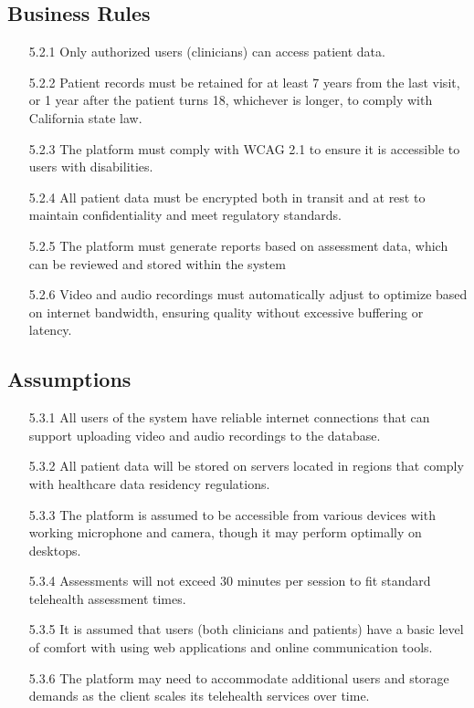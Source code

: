 \documentclass[12pt]{article}
\begin{document}
\subsection{Business Rules}
\begin{itemize}
  \item[5.2.1] Only authorized users (clinicians) can access patient data.
  \item[5.2.2] Patient records must be retained for at least 7 years from the last visit, or 1 year after the patient turns 18, whichever is longer, 
  to comply with California state law.
  \item[5.2.3] The platform must comply with WCAG 2.1 to ensure it is accessible to users with disabilities.
  \item[5.2.4] All patient data must be encrypted both in transit and at rest to maintain confidentiality and meet regulatory standards.
  \item[5.2.5] The platform must generate reports based on assessment data, which can be reviewed and stored within the system 
  \item[5.2.6] Video and audio recordings must automatically adjust to optimize based on internet bandwidth, ensuring quality without excessive 
  buffering or latency.
\end{itemize}
\subsection{Assumptions}
\begin{itemize}
  \item[5.3.1] All users of the system have reliable internet connections that can support uploading video and audio recordings to the database.
  \item[5.3.2] All patient data will be stored on servers located in regions that comply with healthcare data residency regulations.
  \item[5.3.3] The platform is assumed to be accessible from various devices with working microphone and camera, though it may perform optimally on 
  desktops.
  \item[5.3.4] Assessments will not exceed 30 minutes per session to fit standard telehealth assessment times.
  \item[5.3.5] It is assumed that users (both clinicians and patients) have a basic level of comfort with using web applications and online 
  communication tools.
  \item[5.3.6] The platform may need to accommodate additional users and storage demands as the client scales its telehealth services over time.
\end{itemize}
\end{document}

